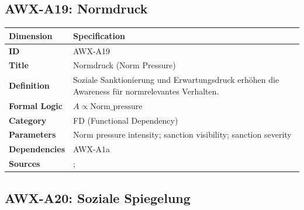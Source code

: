 
\subsection{AWX-A19: Normdruck}

\begin{table}[htbp]
\small
\begin{tabular}{p{3cm}p{11cm}}
\toprule
\textbf{Dimension} & \textbf{Specification} \\
\midrule
\textbf{ID} & AWX-A19 \\
\textbf{Title} & Normdruck (Norm Pressure) \\
\textbf{Definition} & Soziale Sanktionierung und Erwartungsdruck erhöhen die Awareness für normrelevantes Verhalten. \\
\textbf{Formal Logic} & $A \propto \text{Norm\_pressure}$ \\
\textbf{Category} & FD (Functional Dependency) \\
\textbf{Parameters} & Norm pressure intensity; sanction visibility; sanction severity \\
\textbf{Dependencies} & AWX-A1a \\
\textbf{Sources} & \citet{PAP-fehr2004social}; \citet{cialdini2004social} \\
\bottomrule
\end{tabular}
\end{table}


\subsection{AWX-A20: Soziale Spiegelung}

